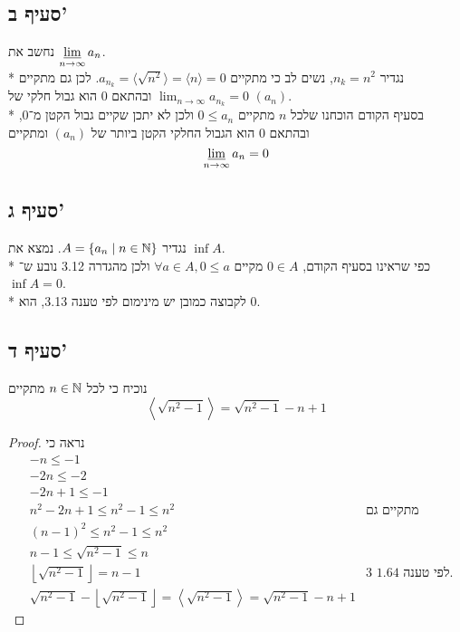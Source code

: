 \subsection{סעיף ב'}
נחשב את $\displaystyle\operatorname*{\underline{lim}}_{n \to \infty} a_n$. \\*
נגדיר $n_k = n^2$, נשים לב כי מתקיים $a_{n_k} = \langle \sqrt{n^2} \rangle = \langle n \rangle = 0$.
לכן גם מתקיים $\lim_{n \to \infty} a_{n_k} = 0$ ובהתאם 0 הוא גבול חלקי של $(a_n)$. \\*
בסעיף הקודם הוכחנו שלכל $n$ מתקיים $0 \le a_n$ ולכן לא יתכן שקיים גבול הקטן מ־0, ובהתאם 0 הוא הגבול החלקי הקטן ביותר של $(a_n)$ ומתקיים
\[
	\operatorname*{\underline{lim}}_{n \to \infty} a_n = 0
\]

\subsection{סעיף ג'}
נגדיר $A = \{ a_n \mid n \in \mathbb{N} \}$. נמצא את $\inf A$. \\*
כפי שראינו בסעיף הקודם, $0 \in A$ מקיים $\forall a \in A, 0 \le a$ ולכן מהגדרה 3.12 נובע ש־$\inf A = 0$. \\*
לקבוצה כמובן יש מינימום לפי טענה 3.13, הוא $0$.

\subsection{סעיף ד'}
נוכיח כי לכל $n \in \mathbb{N}$ מתקיים
\[
	\left\langle \sqrt{n^2 - 1} \right\rangle = \sqrt{n^2 - 1} - n + 1
\]
\begin{proof}
	נראה כי
	\begin{align*}
		& -n \le -1 \\
		& -2n \le -2 \\
		& -2n + 1 \le -1 \\
		& n^2 - 2n + 1 \le n^2 - 1 \le n^2 & \text{מתקיים גם} \\
		& {(n - 1)}^2 \le n^2 - 1 \le n^2 \\
		& n - 1 \le \sqrt{n^2 - 1} \le n \\
		& \left\lfloor \sqrt{n^2 - 1} \right\rfloor = n - 1 & \text{לפי טענה 1.64 3.} \\
		& \sqrt{n^2 - 1} - \left\lfloor \sqrt{n^2 - 1} \right\rfloor = \left\langle \sqrt{n^2 - 1} \right\rangle = \sqrt{n^2 - 1} - n + 1
	\end{align*}
\end{proof}

